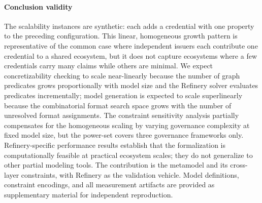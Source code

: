 \paragraph{Conclusion validity}\label{conclusion-validity}

The scalability instances are synthetic: each adds a credential with one property to the preceding configuration. This linear, homogeneous growth pattern is representative of the common case where independent issuers each contribute one credential to a shared ecosystem, but it does not capture ecosystems where a few credentials carry many claims while others are minimal. We expect concretizability checking to scale near-linearly because the number of graph predicates grows proportionally with model size and the Refinery solver evaluates predicates incrementally; model generation is expected to scale superlinearly because the combinatorial format search space grows with the number of unresolved format assignments. The constraint sensitivity analysis partially compensates for the homogeneous scaling by varying governance complexity at fixed model size, but the power-set covers three governance frameworks only. Refinery-specific performance results establish that the formalization is computationally feasible at practical ecosystem scales; they do not generalize to other partial modeling tools. The contribution is the metamodel and its cross-layer constraints, with Refinery as the validation vehicle. Model definitions, constraint encodings, and all measurement artifacts are provided as supplementary material for independent reproduction.
